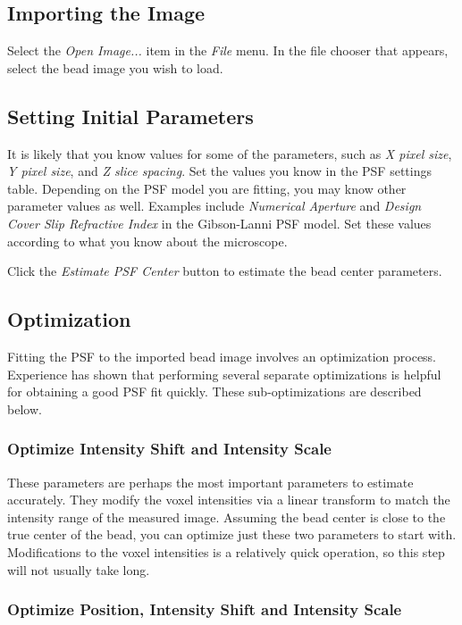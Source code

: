 \documentclass[11pt,titlepage,twoside]{article}
\begin{document}
\subsection{Importing the Image}

Select the \emph{Open Image...} item in the \emph{File} menu. In the file chooser that appears, select the bead image you wish to load.

\subsection{Setting Initial Parameters}

It is likely that you know values for some of the parameters, such as \emph{X pixel size}, \emph{Y pixel size}, and \emph{Z slice spacing}. Set the values you know in the PSF settings table. Depending on the PSF model you are fitting, you may know other parameter values as well. Examples include \emph{Numerical Aperture} and \emph{Design Cover Slip Refractive Index} in the Gibson-Lanni PSF model. Set these values according to what you know about the microscope.

Click the \emph{Estimate PSF Center} button to estimate the bead center parameters.

\subsection{Optimization}

Fitting the PSF to the imported bead image involves an optimization process. Experience has shown that performing several separate optimizations is helpful for obtaining a good PSF fit quickly. These sub-optimizations are described below.

\subsubsection{Optimize Intensity Shift and Intensity Scale}

These parameters are perhaps the most important parameters to estimate accurately. They modify the voxel intensities via a linear transform to match the intensity range of the measured image. Assuming the bead center is close to the true center of the bead, you can optimize just these two parameters to start with. Modifications to the voxel intensities is a relatively quick operation, so this step will not usually take long.

\subsubsection{Optimize Position, Intensity Shift and Intensity Scale}
\end{document}
